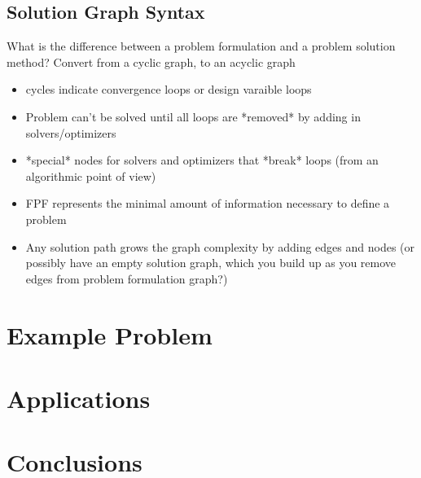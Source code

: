     \subsection{Solution Graph Syntax}
    What is the difference between a problem formulation and a problem solution method? Convert from a cyclic graph, to an acyclic graph
    \begin{itemize}
        \item cycles indicate convergence loops or design varaible loops
        \item Problem can't be solved until all loops are *removed* by adding in solvers/optimizers
        \item *special* nodes for solvers and optimizers that *break* loops (from an algorithmic point of view)
        \item FPF represents the minimal amount of information necessary to define a problem
        \item Any solution path grows the graph complexity by adding edges and nodes (or possibly have an empty solution graph, which you build up
        as you remove edges from problem formulation graph?)
    \end{itemize}

    
\section{Example Problem}

\section{Applications}

\section{Conclusions}


